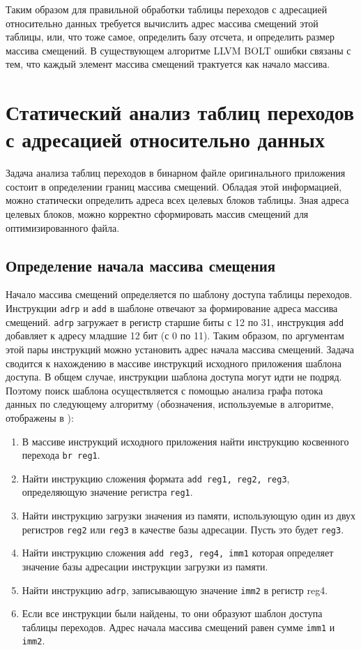 \documentclass{mipt-thesis-bs}
\begin{document}
    Таким образом для правильной обработки таблицы переходов с адресацией относительно данных требуется вычислить адрес массива смещений этой таблицы, или, что тоже самое, определить базу отсчета, и определить размер массива смещений. В существующем алгоритме LLVM BOLT ошибки связаны с тем, что каждый элемент массива смещений трактуется как начало массива.

    \section{Статический анализ таблиц переходов с адресацией относительно данных}
    Задача анализа таблиц переходов в бинарном файле оригинального приложения состоит в определении границ массива смещений. Обладая этой информацией, можно статически определить адреса всех целевых блоков таблицы. Зная адреса целевых блоков, можно корректно сформировать массив смещений для оптимизированного файла.

    \subsection{Определение начала массива смещения}
    Начало массива смещений определяется по шаблону доступа таблицы переходов. Инструкции \verb|adrp| и \verb|add| в шаблоне отвечают за формирование адреса массива смещений. \verb|adrp| загружает в регистр старшие биты с 12 по 31, инструкция \verb|add| добавляет к адресу младшие 12 бит (с 0 по 11). Таким образом, по аргументам этой пары инструкций можно установить адрес начала массива смещений. Задача сводится к нахождению в массиве инструкций исходного приложения шаблона доступа. В общем случае, инструкции шаблона доступа могут идти не подряд. Поэтому поиск шаблона осуществляется с помощью анализа графа потока данных по следующему алгоритму (обозначения, используемые в алгоритме, отображены в ):

    \begin{enumerate}
        \item В массиве инструкций исходного приложения найти инструкцию косвенного перехода \verb|br reg1|.
        \item Найти инструкцию сложения формата \verb|add reg1, reg2, reg3|, определяющую значение регистра \verb|reg1|.
        \item Найти инструкцию загрузки значения из памяти, использующую один из двух регистров \verb|reg2| или \verb|reg3| в качестве базы адресации. Пусть это будет \verb|reg3|.
        \item Найти инструкцию сложения \verb|add reg3, reg4, imm1| которая определяет значение базы адресации инструкции загрузки из памяти.
        \item Найти инструкцию \verb|adrp|, записывающую значение \verb|imm2| в регистр reg4.
        \item Если все инструкции были найдены, то они образуют шаблон доступа таблицы переходов. Адрес начала массива смещений равен сумме \verb|imm1| и \verb|imm2|.
    \end{enumerate}
\end{document}
